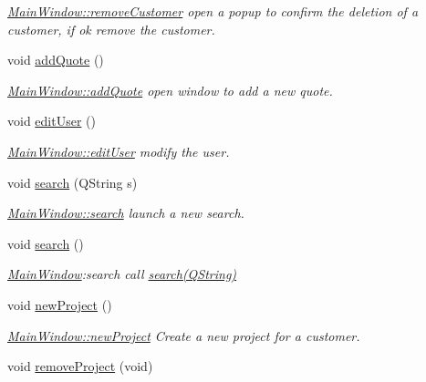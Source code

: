 \begin{DoxyCompactItemize}
\begin{DoxyCompactList}\small\item\em \hyperlink{classGui_1_1MainWindow_ab86dd052f06fb56dbd77e3ae4c228796}{Main\+Window\+::remove\+Customer} open a popup to confirm the deletion of a customer, if ok remove the customer. \end{DoxyCompactList}\item 
void \hyperlink{classGui_1_1MainWindow_aa7d3f2553b55d74885ad7f19ed403dfd}{add\+Quote} ()
\begin{DoxyCompactList}\small\item\em \hyperlink{classGui_1_1MainWindow_aa7d3f2553b55d74885ad7f19ed403dfd}{Main\+Window\+::add\+Quote} open window to add a new quote. \end{DoxyCompactList}\item 
void \hyperlink{classGui_1_1MainWindow_a5dfb182cf52eb48f71e70cd193ef7a8b}{edit\+User} ()
\begin{DoxyCompactList}\small\item\em \hyperlink{classGui_1_1MainWindow_a5dfb182cf52eb48f71e70cd193ef7a8b}{Main\+Window\+::edit\+User} modify the user. \end{DoxyCompactList}\item 
void \hyperlink{classGui_1_1MainWindow_af50656b4c43aa53bae1ac4a3d6b4c953}{search} (Q\+String s)
\begin{DoxyCompactList}\small\item\em \hyperlink{classGui_1_1MainWindow_af50656b4c43aa53bae1ac4a3d6b4c953}{Main\+Window\+::search} launch a new search. \end{DoxyCompactList}\item 
\hypertarget{classGui_1_1MainWindow_aed8cb16bd8f1fc5419abc0038f3dc9ef}{void \hyperlink{classGui_1_1MainWindow_aed8cb16bd8f1fc5419abc0038f3dc9ef}{search} ()}\label{classGui_1_1MainWindow_aed8cb16bd8f1fc5419abc0038f3dc9ef}

\begin{DoxyCompactList}\small\item\em \hyperlink{classGui_1_1MainWindow}{Main\+Window}\+:search call \hyperlink{classGui_1_1MainWindow_af50656b4c43aa53bae1ac4a3d6b4c953}{search(\+Q\+String)} \end{DoxyCompactList}\item 
void \hyperlink{classGui_1_1MainWindow_a8ea6f84e7b61e6f826d8530700f7f780}{new\+Project} ()
\begin{DoxyCompactList}\small\item\em \hyperlink{classGui_1_1MainWindow_a8ea6f84e7b61e6f826d8530700f7f780}{Main\+Window\+::new\+Project} Create a new project for a customer. \end{DoxyCompactList}\item 
\hypertarget{classGui_1_1MainWindow_a7e00765c3da7a97ba937bdecb095200b}{void \hyperlink{classGui_1_1MainWindow_a7e00765c3da7a97ba937bdecb095200b}{remove\+Project} (void)}\label{classGui_1_1MainWindow_a7e00765c3da7a97ba937bdecb095200b}


\end{DoxyCompactItemize}
